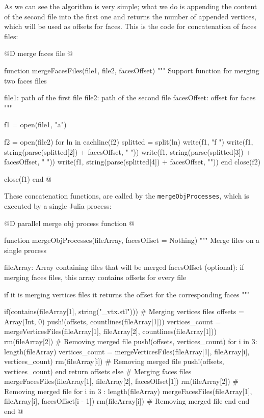 \documentclass[11pt,oneside]{article}	%
\begin{document}
As we can see the algorithm is very simple; what we do is appending the content of the second file into the first one and returns the number of appended vertices, which will be used as offsets for faces. This is the code for concatenation of faces files:

@D merge faces file
@{function mergeFacesFiles(file1, file2, facesOffset)
  """
  Support function for merging two faces files

  file1: path of the first file
  file2: path of the second file
  facesOffset: offset for faces
  """

  f1 = open(file1, "a")

  f2 = open(file2)
  for ln in eachline(f2)
    splitted = split(ln)
    write(f1, "f ")
    write(f1, string(parse(splitted[2]) + facesOffset, " "))
    write(f1, string(parse(splitted[3]) + facesOffset, " "))
    write(f1, string(parse(splitted[4]) + facesOffset, "\n"))
  end
  close(f2)

  close(f1)
end @}

These concatenation functions, are called by the \texttt{mergeObjProcesses}, which is executed by a single Julia process:

@D parallel merge obj process function
@{function mergeObjProcesses(fileArray, facesOffset = Nothing)
  """
  Merge files on a single process

  fileArray: Array containing files that will be merged
  facesOffset (optional): if merging faces files, this array contains
    offsets for every file
    
  if it is merging vertices files it returns the offset 
  for the corresponding faces
  """

  if(contains(fileArray[1], string("_vtx.stl")))
    # Merging vertices files
    offsets = Array(Int, 0)
    push!(offsets, countlines(fileArray[1]))
    vertices_count = mergeVerticesFiles(fileArray[1], fileArray[2], countlines(fileArray[1]))
    rm(fileArray[2]) # Removing merged file
    push!(offsets, vertices_count)
    for i in 3: length(fileArray)
      vertices_count = mergeVerticesFiles(fileArray[1], fileArray[i], vertices_count)
      rm(fileArray[i]) # Removing merged file
      push!(offsets, vertices_count)
    end
    return offsets
  else
    # Merging faces files
    mergeFacesFiles(fileArray[1], fileArray[2], facesOffset[1])
    rm(fileArray[2]) # Removing merged file
    for i in 3 : length(fileArray)
      mergeFacesFiles(fileArray[1], fileArray[i], facesOffset[i - 1])
      rm(fileArray[i]) # Removing merged file
    end
  end
end @}
\end{document}
